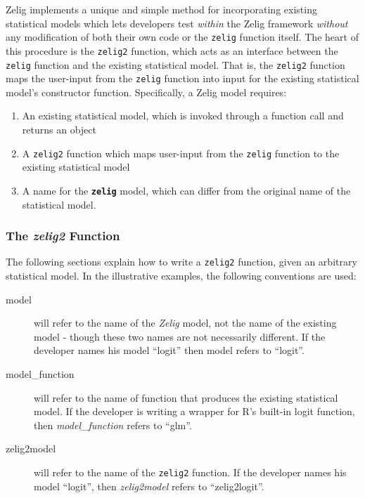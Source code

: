 Zelig implements a unique and simple method for incorporating existing statistical models which lets developers test \emph{within} the Zelig framework \emph{without} any modification of both their own code or the {\tt zelig} function itself.  The heart of this procedure is the {\tt zelig2} function, which acts as an interface between the {\tt zelig} function and the existing statistical model.  That is, the {\tt zelig2} function maps the user-input from the {\tt zelig} function into input for the existing statistical model's constructor function.  Specifically, a Zelig model requires:

\begin{enumerate}
	\item{An existing statistical model, which is invoked through a function call and returns an object}
	\item{A {\tt zelig2} function which maps user-input from the {\tt zelig} function to the existing statistical model}
	\item{A name for the {\tt \bf zelig} model, which can differ from the original name of the statistical model.}
\end{enumerate}


\subsubsection{The \emph{zelig2} Function}
The following sections explain how to write a {\tt zelig2} function, given an arbitrary statistical model.  In the illustrative examples, the following conventions are used:

\begin{description}
	\item[model]{will refer to the name of the \emph{Zelig} model, not the name of the existing model - though these two names are not necessarily different.  If the developer names his model ``logit'' then model refers to ``logit''.}
	\item[model\_function]{will refer to the name of function that produces the existing statistical model.  If the developer is writing a wrapper for R's built-in logit function, then \emph{model\_function} refers to ``glm''.}
	\item[zelig2model]{will refer to the name of the {\tt zelig2} function.  If the developer names his model ``logit'', then \emph{zelig2model} refers to ``zelig2logit''.}
\end{description}



